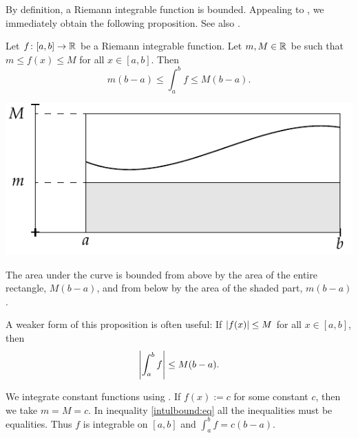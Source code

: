 By definition, a Riemann integrable function is bounded.
Appealing to , we immediately obtain
the following proposition.  See also .

\begin{prop} \label{intbound:prop}
Let $f \colon [a,b] \to {\mathbb{R}}$ be a Riemann integrable function.
Let $m, M \in {\mathbb{R}}$ be 
such that $m \leq f(x) \leq M$ for all $x \in [a,b]$.  Then
\begin{equation*}
m(b-a) \leq
\int_a^b f
\leq M(b-a) .
\end{equation*}
\end{prop}
\begin{myfigureht}
\includegraphics{figures/integralminmax}
\caption{The area under the curve is bounded from above by
the area of the entire rectangle, $M(b-a)$, and from below by
the area of the shaded part, $m(b-a)$.\label{fig:integralminmax}}
\end{myfigureht}

A weaker form of this proposition is often useful:
If $\left\lvert {f(x)} \right\rvert \leq M$ for all $x \in [a,b]$, then
\begin{equation*}
\left\lvert {\int_a^b f} \right\rvert \leq M(b-a) .
\end{equation*}

\begin{example}
We integrate constant functions using
.
If $f(x) := c$ for some constant $c$, then we take $m = M = c$.
In inequality \eqref{intulbound:eq}
all the inequalities must be equalities.
Thus $f$ is integrable on $[a,b]$ and $\int_a^b f = c(b-a)$.
\end{example}

